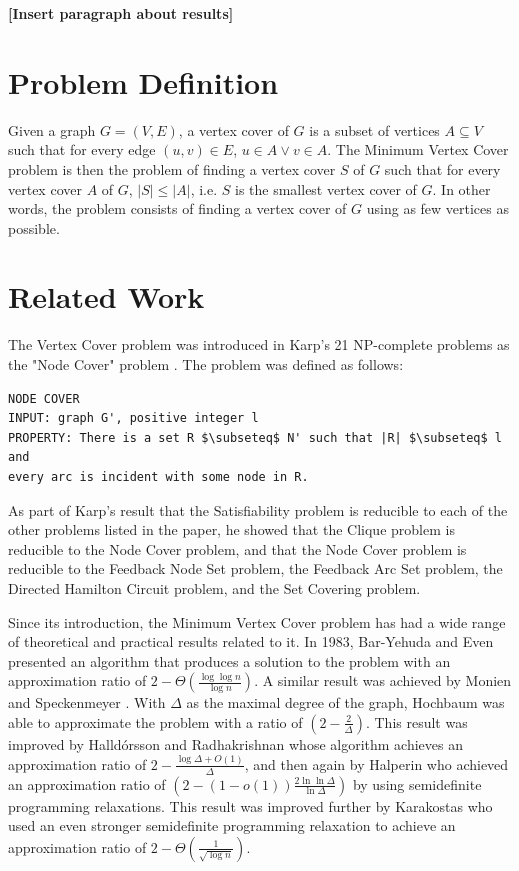 \documentclass[acmlarge]{acmart}
\begin{document}
\textbf{[Insert paragraph about results]}


\section{Problem Definition}

Given a graph $G = (V,E)$, a vertex cover of $G$ is a subset of vertices $A \subseteq V$ such that for every edge $(u,v) \in E$, $u \in A \lor v \in A$. The Minimum Vertex Cover problem is then the problem of finding a vertex cover $S$ of $G$ such that for every vertex cover $A$ of $G$, $|S| \leq |A|$, i.e. $S$ is the smallest vertex cover of $G$. In other words, the problem consists of finding a vertex cover of $G$ using as few vertices as possible.

\section{Related Work}


The Vertex Cover problem was introduced in Karp's 21 NP-complete problems as the "Node Cover" problem \cite{karp1972reducibility}. The problem was defined as follows:
\begin{lstlisting}
NODE COVER
INPUT: graph G', positive integer l
PROPERTY: There is a set R $\subseteq$ N' such that |R| $\subseteq$ l and
every arc is incident with some node in R.
\end{lstlisting}

As part of Karp's result that the Satisfiability problem is reducible to each of the other problems listed in the paper, he showed that the Clique problem is reducible to the Node Cover problem, and that the Node Cover problem is reducible to the Feedback Node Set problem, the Feedback Arc Set problem, the Directed Hamilton Circuit problem, and the Set Covering problem.

Since its introduction, the Minimum Vertex Cover problem has had a wide range of theoretical and practical results related to it. In 1983, Bar-Yehuda and Even \cite{bar1983local} presented an algorithm that produces a solution to the problem with an approximation ratio of $2-\Theta(\frac{\log \log n}{\log n})$. A similar result was achieved by Monien and Speckenmeyer \cite{monien1985ramsey}.  
With $\Delta$ as the maximal degree of the graph, Hochbaum \cite{hochbaum1983efficient} was able to approximate the problem with a ratio of $(2 - \frac{2}{\Delta})$. This result was improved by Halld\'{o}rsson and Radhakrishnan \cite{Hall97} whose algorithm achieves an approximation ratio of $2- \frac{\log \Delta + O(1)}{\Delta}$, and then again by Halperin \cite{halperin2002improved} who achieved an approximation ratio of $(2 - (1 - o(1)) \frac{2 \ln \ln \Delta}{\ln \Delta})$ by using semidefinite programming relaxations. This result was improved further by Karakostas \cite{karakostas2005better} who used an even stronger semidefinite programming relaxation to achieve an approximation ratio of $2 - \Theta (\frac{1}{\sqrt{\log n}})$.
\end{document}
